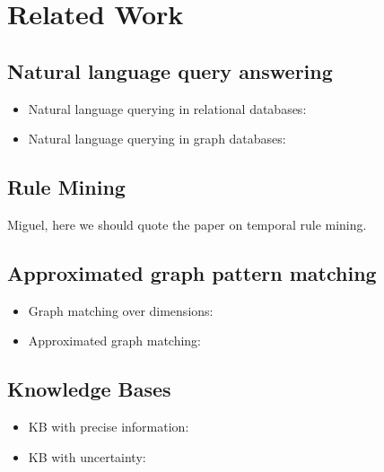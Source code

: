 \section{Related Work}

\subsection{Natural language query answering}\label{sec:queryanswer}
\begin{itemize}
\item Natural language querying in relational databases: \cite{Li16,Saha16}
\item Natural language querying in graph databases: \cite{Hu0YWZ18}
\end{itemize}

\subsection{Rule Mining}\label{sec:rulemining}
Miguel, here we should quote the paper on temporal rule mining.

\subsection{Approximated graph pattern matching}\label{sec:matching}
\begin{itemize}
\item Graph matching over dimensions: \cite{PetermannMBPR17}
\item Approximated graph matching: \cite{DeVirgilio2015, ALIGON201520}
\end{itemize}

\subsection{Knowledge Bases}\label{sec:kbconstr}
\begin{itemize}
\item KB with precise information: \cite{ibmwatson}
\item KB with uncertainty: \cite{Chen14, Niu}
\end{itemize}
